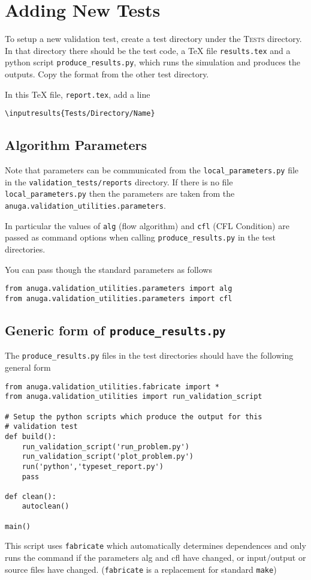 \documentclass[11pt,a4paper]{report}
\begin{document}
\appendix
\chapter{Adding New Tests}


To setup a new validation test, create a test directory under the
\textsc{Tests} directory. In that directory there should be the test code, a
\TeX{} file \texttt{results.tex} and a python script
\texttt{produce\_results.py}, which runs the simulation and produces the
outputs. Copy the format from the other test directory. 

In this \TeX{} file, \texttt{report.tex}, add a line
\begin{verbatim}
\inputresults{Tests/Directory/Name}
\end{verbatim}



\section{Algorithm Parameters}
Note that parameters can be communicated from the \verb|local_parameters.py|
file in the \verb|validation_tests/reports| directory. If there is no file
\verb|local_parameters.py| then the parameters are taken from the
\verb|anuga.validation_utilities.parameters|. 

In particular the
values of \verb|alg| (flow algorithm) and \verb|cfl| (CFL Condition)
are passed as command options when calling \verb|produce_results.py| in the
test directories.

You can pass though the standard parameters as follows
\begin{verbatim}
from anuga.validation_utilities.parameters import alg
from anuga.validation_utilities.parameters import cfl
\end{verbatim}

\section{Generic form of \texttt{produce\_results.py}}

The \texttt{produce\_results.py} files in the test directories should have the
following general form

\begin{verbatim}
from anuga.validation_utilities.fabricate import *
from anuga.validation_utilities import run_validation_script

# Setup the python scripts which produce the output for this
# validation test
def build():
    run_validation_script('run_problem.py')
    run_validation_script('plot_problem.py')
    run('python','typeset_report.py')
    pass

def clean():
    autoclean()

main()
\end{verbatim}
This script uses \texttt{fabricate} which automatically determines dependences
and only runs the command if the parameters alg and cfl have changed,
or input/output or source files have changed. (\texttt{fabricate} is a replacement for
standard \texttt{make})





\end{document}

